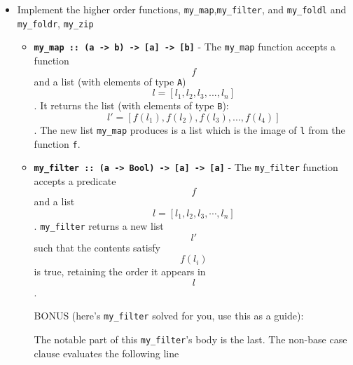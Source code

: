 \begin{itemize}
\item
  Implement the higher order functions,
  \texttt{my\_map},\texttt{my\_filter}, and \texttt{my\_foldl} and
  \texttt{my\_foldr}, \texttt{my\_zip}

  \begin{itemize}
  \item
    \textbf{\texttt{my\_map\ ::\ (a\ -\textgreater{}\ b)\ -\textgreater{}\ {[}a{]}\ -\textgreater{}\ {[}b{]}}}
    - The \texttt{my\_map} function accepts a function \[f\] and a list
    (with elements of type \texttt{A}) \[l=[l_1,l_2,l_3,...,l_n]\]. It
    returns the list (with elements of type \texttt{B}):
    \[l'=[f(l_1),f(l_2),f(l_3),...,f(l_4)]\]. The new list
    \texttt{my\_map} produces is a list which is the image of \texttt{l}
    from the function \texttt{f}.
  \item
    \textbf{\texttt{my\_filter\ ::\ (a\ -\textgreater{}\ Bool)\ -\textgreater{}\ {[}a{]}\ -\textgreater{}\ {[}a{]}}}
    - The \texttt{my\_filter} function accepts a predicate \[f\] and a
    list \[l=[l_1,l_2,l_3,\cdots,l_n]\]. \texttt{my\_filter} returns a
    new list \[l'\] such that the contents satisfy \[f(l_i)\] is true,
    retaining the order it appears in \[l\].

    BONUS (here's \texttt{my\_filter} solved for you, use this as a
    guide):

\begin{Shaded}
\begin{Highlighting}[]
\OtherTok{{-}\textgreater{}} \NormalTok{) }\OtherTok{{-}\textgreater{}}\NormalTok{ [a] }\OtherTok{{-}\textgreater{}}\NormalTok{ [a]}
\OtherTok{=} 
     \OperatorTok{==}  \NormalTok{ []}
    \NormalTok{ (}\NormalTok{ [}\NormalTok{ l] }\NormalTok{ []) }\OperatorTok{++}
\end{Highlighting}
\end{Shaded}

    The notable part of this \texttt{my\_filter}'s body is the last. The
    non-base case clause evaluates the following line

\begin{Shaded}
\begin{Highlighting}[]
\NormalTok{(}\NormalTok{ [}\NormalTok{ l] }\NormalTok{ []) }\OperatorTok{++}
\end{Highlighting}
\end{Shaded}


\end{itemize}
\end{itemize}

